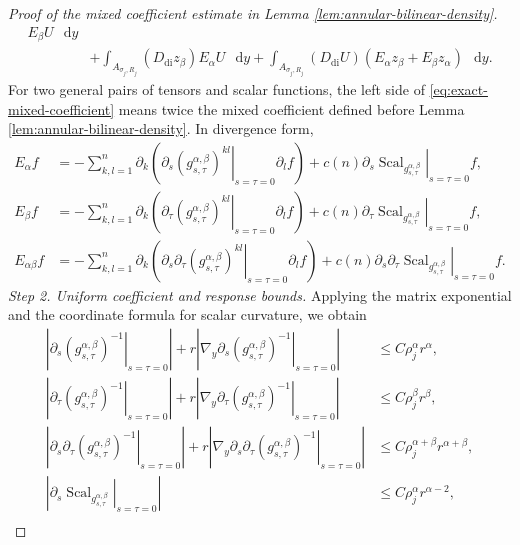 \documentclass[11pt]{article}
\numberwithin{equation}{section}
\theoremstyle{remark}
\newcommand{\dd}{\mathop{}\!\mathrm{d}}
\begin{document}
\begin{proof}[Proof of the mixed coefficient estimate in
Lemma  \ref{lem:annular-bilinear-density}]
{\begin{equation}
\begin{aligned}
 E_\beta U\,\dd y\\
 &+\int_{A_{\sigma_j,R_j}}(D_{\mathrm{di}}z_\beta)
 E_\alpha U\,\dd y+\int_{A_{\sigma_j,R_j}}(D_{\mathrm{di}}U)
 (E_\alpha z_\beta+E_\beta z_\alpha)\,\dd y.
 \end{aligned}
\end{equation}
}
{For two general pairs of tensors and scalar functions, the
left side of
\eqref{eq:exact-mixed-coefficient} means twice the mixed coefficient defined
before Lemma  \ref{lem:annular-bilinear-density}.}
In divergence form,
\[
\begin{aligned}
 E_\alpha f
 &=-\sum_{k,l=1}^n\partial_k\left(
 \left.\partial_s(g_{s,\tau}^{\alpha,\beta})^{kl}\right|_{s=\tau=0}
 \partial_lf\right)
 +c(n)\left.\partial_s\operatorname{Scal}_{g_{s,\tau}^{\alpha,\beta}}\right|_{s=\tau=0}f,\\
 E_\beta f
 &=-\sum_{k,l=1}^n\partial_k\left(
 \left.\partial_\tau(g_{s,\tau}^{\alpha,\beta})^{kl}\right|_{s=\tau=0}
 \partial_lf\right)
 +c(n)\left.\partial_\tau \operatorname{Scal}_{g_{s,\tau}^{\alpha,\beta}}\right|_{s=\tau=0}f,\\
 E_{\alpha\beta}f
 &=-\sum_{k,l=1}^n\partial_k\left(
 \left.\partial_s\partial_\tau
 (g_{s,\tau}^{\alpha,\beta})^{kl}\right|_{s=\tau=0}
 \partial_lf\right)
 +c(n)\left.\partial_s\partial_\tau
 \operatorname{Scal}_{g_{s,\tau}^{\alpha,\beta}}\right|_{s=\tau=0}f.
\end{aligned}
\]
\emph{Step 2. Uniform coefficient and response bounds.}
{Applying the matrix exponential and the coordinate formula for
scalar curvature, we obtain
\[
\begin{aligned}
 \left|\left.\partial_s(g_{s,\tau}^{\alpha,\beta})^{-1}
 \right|_{s=\tau=0}\right|
 +r\left|\nabla_y\left.\partial_s(g_{s,\tau}^{\alpha,\beta})^{-1}
 \right|_{s=\tau=0}\right|
 &\le C\rho_j^\alpha r^\alpha,\\
 \left|\left.\partial_\tau(g_{s,\tau}^{\alpha,\beta})^{-1}
 \right|_{s=\tau=0}\right|
 +r\left|\nabla_y\left.\partial_\tau(g_{s,\tau}^{\alpha,\beta})^{-1}
 \right|_{s=\tau=0}\right|
 &\le C\rho_j^\beta r^\beta,\\
 \left|\left.\partial_s\partial_\tau(g_{s,\tau}^{\alpha,\beta})^{-1}
 \right|_{s=\tau=0}\right|
 +r\left|\nabla_y\left.
 \partial_s\partial_\tau(g_{s,\tau}^{\alpha,\beta})^{-1}
 \right|_{s=\tau=0}\right|
 &\le C\rho_j^{\alpha+\beta}r^{\alpha+\beta},\\
 \left|\left.\partial_s\operatorname{Scal}_{g_{s,\tau}^{\alpha,\beta}}
 \right|_{s=\tau=0}\right|
 &\le C\rho_j^\alpha r^{\alpha-2},\\

\end{aligned}\]}
\end{proof}
\end{document}
